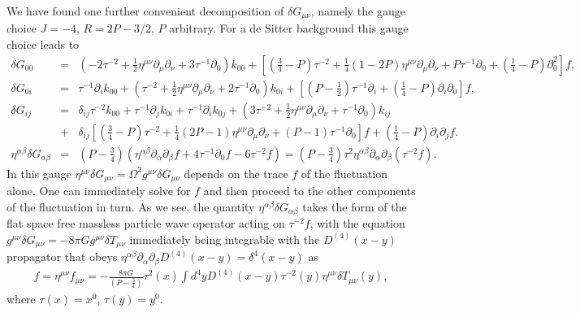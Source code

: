 \documentclass[aps]{revtex4}
\begin{document}
We have found one further convenient decomposition of $\delta G_{\mu\nu}$, namely the gauge choice $J=-4$, $R=2P-3/2$, $P$ arbitrary. For a de Sitter background this gauge choice leads to
%
\begin{eqnarray}
\delta G_{00}&=&(-2 \tau^{-2}
 + \tfrac{1}{2} \eta^{\mu \nu} \partial_{\mu} \partial_{\nu}
 + 3 \tau^{-1} \partial_{0}) k_{00}
 + \left[(\tfrac{3}{4} -  P) \tau^{-2}
 + \tfrac{1}{4}(1-2P) \eta^{\mu \nu} \partial_{\mu} \partial_{\nu}
 + P \tau^{-1} \partial_{0}
 +( \tfrac{1}{4} -P)\partial^2_{0}\right]f,
\nonumber\\
\delta G_{0i}&=&\tau^{-1} \partial_{i} k_{00}
 + (\tau^{-2}
 + \tfrac{1}{2} \eta^{\mu \nu} \partial_{\mu} \partial_{\nu}
 + 2 \tau^{-1} \partial_{0}) k_{0i}
 + \left[(P- \tfrac{1}{2}) \tau^{-1} \partial_{i}
 + (\tfrac{1}{4}-P) \partial_{i} \partial_{0} \right]f,
\nonumber\\
\delta G_{ij}&=&\delta_{ij}\tau^{-2} k_{00}
 +\tau^{-1} \partial_{j} k_{0i}
 + \tau^{-1} \partial_{i} k_{0j}
 + (3 \tau^{-2}
 + \tfrac{1}{2} \eta^{\mu \nu} \partial_{\mu} \partial_{\nu}
 + \tau^{-1} \partial_{0}) k_{ij}
  \nonumber\\
 &+& \delta_{ij}\left[(\tfrac{3}{4}-P) \tau^{-2}
 + \tfrac{1}{4}(2P-1) \eta^{\mu \nu} \partial_{\mu} \partial_{\nu}
  +(P-1)\tau^{-1} \partial_{0}\right]f
 + (\tfrac{1}{4}-P) \partial_{i} \partial_{j}f.
\nonumber\\
\eta^{\alpha\beta}\delta G_{\alpha\beta}&=&(P-\tfrac{3}{4})( \eta^{\alpha\beta}\partial_{\alpha}\partial_{\beta}f +4\tau^{-1}\partial_0 f-6\tau^{-2}f)=(P-\tfrac{3}{4})\tau^2 \eta^{\alpha\beta}\partial_{\alpha}\partial_{\beta}(\tau^{-2}f).
\label{D6}
\end{eqnarray}
%
In this gauge $\eta^{\mu\nu}\delta G_{\mu\nu}=\Omega^2g^{\mu\nu}\delta G_{\mu\nu}$ depends on the trace $f$ of the fluctuation alone. One can immediately solve for $f$ and then proceed to the other components of the fluctuation in turn. As we see,  the quantity $\eta^{\alpha\beta}\delta G_{\alpha\beta}$ takes the form of the flat space free massless particle wave operator acting on $\tau^{-2} f$, with the equation $g^{\mu\nu}\delta G_{\mu\nu}=-8\pi G g^{\mu\nu}\delta T_{\mu\nu}$ immediately being integrable with the $D^{(4)}(x-y)$ propagator that obeys $\eta^{\alpha\beta}\partial_{\alpha}\partial_{\beta}D^{(4)}(x-y)=\delta^4(x-y)$ as
%
\begin{eqnarray}
f=\eta^{\mu\nu}f_{\mu\nu}=-\frac{8\pi G}{(P-\tfrac{3}{4})}\tau^2(x) \int d^4yD^{(4)}(x-y)\tau^{-2}(y)\eta^{\mu\nu}\delta T_{\mu\nu}(y),
\label{D7}
\end{eqnarray}
%
where $\tau(x)=x^0$, $\tau(y)=y^0$.
\end{document}
